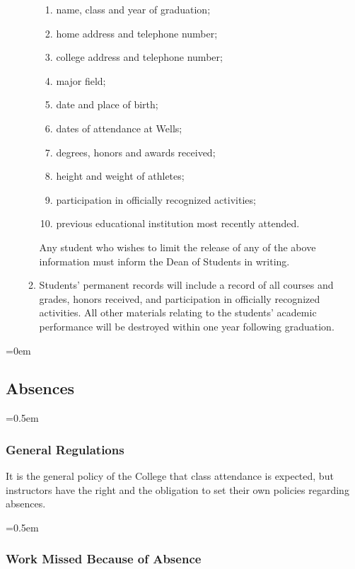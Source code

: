 \documentclass{manual}
\let\oldsubsection\subsection
\renewcommand\subsection{\leftskip=0em\oldsubsection}
\let\oldsubsubsection\subsubsection
\renewcommand\subsubsection{\leftskip=0.5em\oldsubsubsection}
\newcommand{\itemLevelA}{\alph*.}
\newcommand{\itemLevelB}{\arabic*)}
\newcommand{\itemRefA}{\alph*}
\newcommand{\itemRefB}{\arabic*}
\begin{document}
\begin{enumerate}[label=\itemLevelA,ref=\itemRefA]
\begin{enumerate}[label=\itemLevelB,ref=\itemRefB]
			\begin{enumerate}[label=\alph*)]
			\item name, class and year of graduation;
			\item home address and telephone number;
			\item college address and telephone number;
			\item major field;
			\item date and place of birth;
			\item dates of attendance at Wells;
			\item degrees, honors and awards received;
			\item height and weight of athletes;
			\item participation in officially recognized activities;
			\item previous educational institution most recently attended.
			\end{enumerate}

		Any student who wishes to limit the release of any of the above information must inform the Dean of Students in writing.

		\item Students' permanent records will include a record of all courses and grades, honors received, and participation in officially recognized activities. All other materials relating to the students' academic performance will be destroyed within one year following graduation.
		\end{enumerate}
	
	\end{enumerate}

\subsection{Absences}

\subsubsection{General Regulations}

It is the general policy of the College that class attendance is expected, but instructors have the right and the obligation to set their own policies regarding absences.

\subsubsection{Work Missed Because of Absence}
\end{document}
